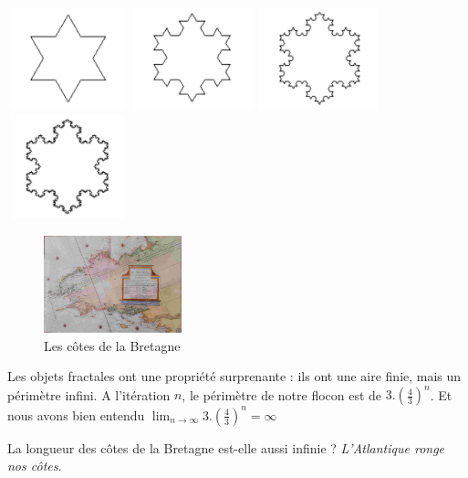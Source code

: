 \includegraphics[width=3.5cm, height=3cm]{flocon1.pdf}
\includegraphics[width=3.5cm, height=3cm]{flocon2.pdf}
\includegraphics[width=3.5cm, height=3cm]{flocon3.pdf}
\includegraphics[width=3.5cm, height=3cm]{flocon4.pdf}


\begin{figure}[H]
	\centering
	\caption{Les côtes de la Bretagne}
	\includegraphics[width=4.0cm]{bretagne3.jpg}
\end{figure}

Les objets fractales ont une propriété surprenante : ils ont une aire finie, mais un périmètre infini.
A l'itération $n$, le périmètre de notre flocon est de $3.(\frac{4}{3})^n$. Et nous avons bien entendu 
$\lim_{n \rightarrow \infty} 3.(\frac{4}{3})^n =\infty $


La longueur des côtes de la Bretagne est-elle aussi infinie ?
\textit{L'Atlantique ronge nos côtes.} \cite{vh}

